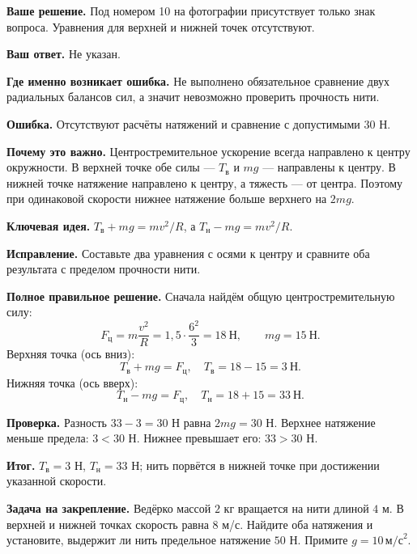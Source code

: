 \documentclass[a4paper,11pt]{article}
\newcommand{\keyidea}{\textcolor{accent}{\textbf{Ключевая идея.}}}
\newcommand{\mistake}{\textcolor{error}{\textbf{Ошибка.}}}
\newcommand{\result}{\textcolor{accent}{\textbf{Итог.}}}
\newcommand{\field}[1]{\par\vspace{2pt}\textbf{#1}\quad}
\begin{document}
\field{Ваше решение.} Под номером 10 на фотографии присутствует только знак вопроса. Уравнения для верхней и нижней точек отсутствуют.

\field{Ваш ответ.} Не указан.

\field{Где именно возникает ошибка.} Не выполнено обязательное сравнение двух радиальных балансов сил, а значит невозможно проверить прочность нити.

\mistake{} Отсутствуют расчёты натяжений и сравнение с допустимыми $30$ Н.

\field{Почему это важно.} Центростремительное ускорение всегда направлено к центру окружности. В верхней точке обе силы --- $T_{\text{в}}$ и $mg$ --- направлены к центру. В нижней точке натяжение направлено к центру, а тяжесть --- от центра. Поэтому при одинаковой скорости нижнее натяжение больше верхнего на $2mg$.

\keyidea{} $T_{\text{в}}+mg=mv^2/R$, а $T_{\text{н}}-mg=mv^2/R$.

\field{Исправление.} Составьте два уравнения с осями к центру и сравните оба результата с пределом прочности нити.

\field{Полное правильное решение.} Сначала найдём общую центростремительную силу:
\[
F_{\text{ц}}=m\frac{v^2}{R}=1{,}5\cdot\frac{6^2}{3}=18\ \text{Н},\qquad mg=15\ \text{Н}.
\]
Верхняя точка (ось вниз):
\[
T_{\text{в}}+mg=F_{\text{ц}},\quad
T_{\text{в}}=18-15=\boxed{3\ \text{Н}}.
\]
Нижняя точка (ось вверх):
\[
T_{\text{н}}-mg=F_{\text{ц}},\quad
T_{\text{н}}=18+15=\boxed{33\ \text{Н}}.
\]
\field{Проверка.} Разность $33-3=30$ Н равна $2mg=30$ Н. Верхнее натяжение меньше предела: $3<30$ Н. Нижнее превышает его: $33>30$ Н.

\result{} $T_{\text{в}}=3$ Н, $T_{\text{н}}=33$ Н; нить порвётся в нижней точке при достижении указанной скорости.

\field{Задача на закрепление.} Ведёрко массой $2$ кг вращается на нити длиной $4$ м. В верхней и нижней точках скорость равна $8$ м/с. Найдите оба натяжения и установите, выдержит ли нить предельное натяжение $50$ Н. Примите $g=10\,\text{м/с}^2$.
\end{document}
